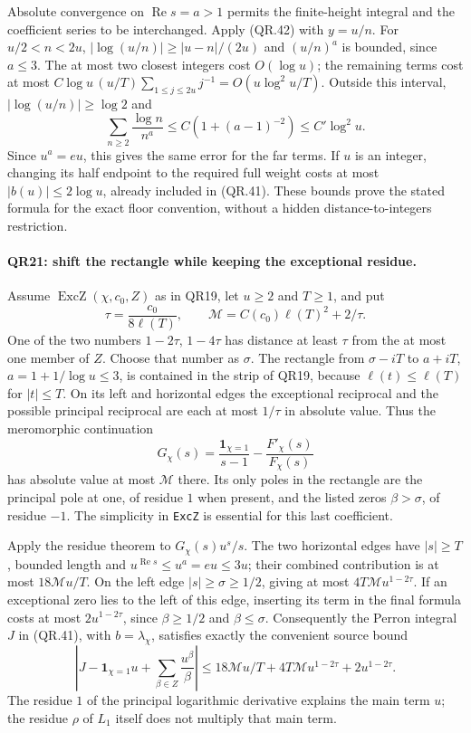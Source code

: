 Absolute convergence on $\operatorname{Re}s=a>1$ permits the
finite-height integral and the coefficient series to be interchanged.
Apply (QR.42) with $y=u/n$. For $u/2<n<2u$,
$|\log(u/n)|\ge|u-n|/(2u)$ and $(u/n)^a$ is bounded, since
$a\le3$. The at most two closest integers cost $O(\log u)$;
the remaining terms cost at most
$C\log u\,(u/T)\sum_{1\le j\le2u}j^{-1}
 =O(u\log^2u/T)$. Outside this interval,
$|\log(u/n)|\ge\log2$ and
\[
 \sum_{n\ge2}\frac{\log n}{n^a}
                   \le C(1+(a-1)^{-2})\le C'\log^2u.
\]
Since $u^a=eu$, this gives the same error for the far terms.
If $u$ is an integer, changing its half endpoint to the required
full weight costs at most $|b(u)|\le2\log u$, already included
in (QR.41). These bounds prove the stated formula for the exact
floor convention, without a hidden distance-to-integers restriction.

\paragraph{QR21: shift the rectangle while keeping the exceptional residue.}
Assume $\operatorname{ExcZ}(\chi,c_0,Z)$ as in QR19, let $u\ge2$
and $T\ge1$, and put
\[
 \tau=\frac{c_0}{8\ell(T)},\qquad
 \mathcal M=C(c_0)\ell(T)^2+2/\tau.
\]
One of the two numbers $1-2\tau$, $1-4\tau$ has distance at
least $\tau$ from the at most one member of $Z$. Choose that
number as $\sigma$. The rectangle from $\sigma-iT$ to $a+iT$,
$a=1+1/\log u\le3$, is contained in the strip of QR19, because
$\ell(t)\le\ell(T)$ for $|t|\le T$. On its left and horizontal
edges the exceptional reciprocal and the possible principal reciprocal
are each at most $1/\tau$ in absolute value. Thus the meromorphic
continuation
\[
        G_\chi(s)=\frac{\mathbf1_{\chi=1}}{s-1}
                                  -\frac{F'_\chi(s)}{F_\chi(s)}
\]
has absolute value at most $\mathcal M$ there. Its only poles in
the rectangle are the principal pole at one, of residue $1$ when
present, and the listed zeros $\beta>\sigma$, of residue $-1$.
The simplicity in \texttt{ExcZ} is essential for this last coefficient.

Apply the residue theorem to $G_\chi(s)u^s/s$. The two horizontal
edges have $|s|\ge T$, bounded length and $u^{\operatorname{Re}s}
\le u^a=eu\le3u$; their combined contribution is at most
$18\mathcal M u/T$. On the left edge $|s|\ge\sigma\ge1/2$,
giving at most $4T\mathcal M u^{1-2\tau}$.
If an exceptional zero lies to the left of this edge, inserting its
term in the final formula costs at most $2u^{1-2\tau}$, since
$\beta\ge1/2$ and $\beta\le\sigma$.
Consequently the Perron integral $J$ in (QR.41), with
$b=\lambda_\chi$, satisfies exactly the convenient source bound
\[
 \left|J-\mathbf1_{\chi=1}u+\sum_{\beta\in Z}\frac{u^\beta}{\beta}\right|
 \le18\mathcal M u/T+4T\mathcal M u^{1-2\tau}
                                      +2u^{1-2\tau}.       \tag{QR.43}
\]
The residue $1$ of the principal logarithmic derivative explains
the main term $u$; the residue $\rho$ of $L_1$ itself does not
multiply that main term.

